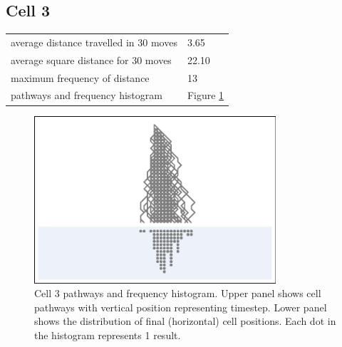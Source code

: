\documentclass[11pt,a4paper]{article}
\newcommand \bt{\begin{longtable}{p{0.65\textwidth}p{0.25\textwidth}}}
\newcommand \et{\end{longtable}}
\begin{document}
\subsection*{Cell 3}
\bt
average distance travelled in 30 moves &  3.65\\
average square distance for 30 moves & 22.10\\
maximum frequency of distance & 13\\
pathways and frequency histogram & Figure \ref{fig3}
\et
\begin{figure}[htbp]
\begin{center}
\includegraphics[width=0.8\textwidth]{CA30_R40L40_3.eps}
\caption{Cell 3 pathways and frequency histogram. Upper panel shows cell pathways with vertical position representing timestep. 
Lower panel shows the distribution of final (horizontal) cell positions. Each dot in the histogram represents 1 result.}
\label{fig3}
\end{center}
\end{figure}
\end{document}
